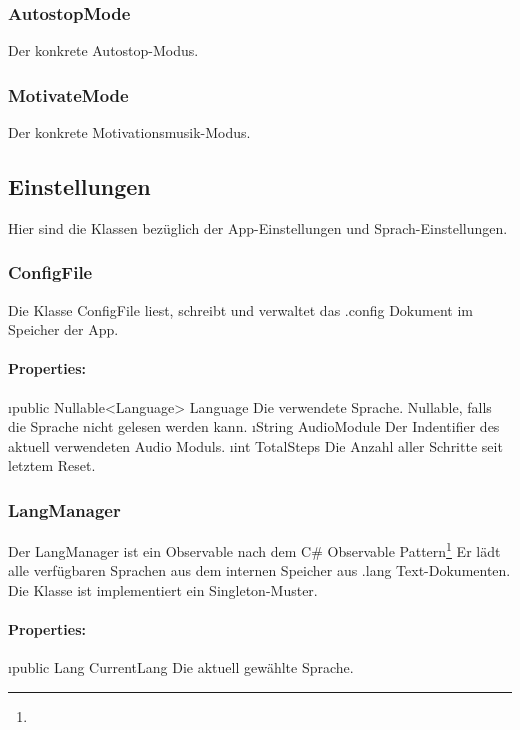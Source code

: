 \documentclass[../entwurf.tex]{subfiles}
\begin{document}
			\subsubsection{AutostopMode}
				Der konkrete Autostop-Modus.
			\subsubsection{MotivateMode}
				Der konkrete Motivationsmusik-Modus.
		\subsection{Einstellungen}
			Hier sind die Klassen bezüglich der App-Einstellungen und Sprach-Einstellungen.
			\subsubsection{ConfigFile}
				Die Klasse ConfigFile liest, schreibt und verwaltet das .config Dokument im Speicher der App.
				\paragraph{Properties:}
					\begin{itemize}
						\i{public Nullable<Language> Language} Die verwendete Sprache. Nullable, falls die Sprache nicht gelesen werden kann.
						\i{String AudioModule} Der Indentifier des aktuell verwendeten Audio Moduls.
						\i{int TotalSteps} Die Anzahl aller Schritte seit letztem Reset.
					\end{itemize}
			\subsubsection{LangManager}
				Der LangManager ist ein Observable nach dem 
				C\# Observable Pattern\footnote{}
				Er lädt alle verfügbaren Sprachen aus dem internen Speicher aus .lang Text-Dokumenten.
				Die Klasse ist implementiert ein Singleton-Muster.
				\paragraph{Properties:}
					\begin{itemize}
						\i{public Lang CurrentLang} Die aktuell gewählte Sprache.
					\end{itemize}
\end{document}
